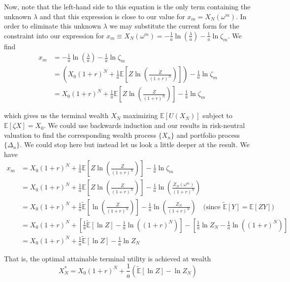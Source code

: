 \documentclass[12pt]{article}
\newlength\tindent
\renewcommand{\indent}{\hspace*{\tindent}}
\newcommand{\E}{\mathbb E}
\begin{document}
\indent Now, note that the left-hand side to this equation is the only term containing the unknown $\lambda$ and that this expression is close to our value for $x_m = X_N(\omega^m)$. In order to eliminate this unknown $\lambda$ we may substitute the current form for the constraint into our expression for $x_m \equiv X_N(\omega^m) =  -\frac{1}{a} \ln \left( \frac{\lambda}{a} \right) - \frac{1}{a} \ln \zeta_m$. We find
\begin{align*}
	x_m &= -\frac{1}{a} \ln \left( \frac{\lambda}{a} \right) - \frac{1}{a} \ln \zeta_m \\
	&= \left(  X_0(1 + r)^N + \frac{1}{a} \E \left[ Z \ln \left( \frac{Z}{(1 + r)^N} \right) \right] \right) - \frac{1}{a}\ln \zeta_m \\
	&=  X_0(1 + r)^N + \frac{1}{a} \E \left[ Z \ln \left( \frac{Z}{(1 + r)^N} \right) \right] - \frac{1}{a}\ln \zeta_m
\end{align*}

which gives us the terminal wealth $X_N$ maximizing $\E[U(X_N)]$ subject to $\E[\zeta X] = X_0$. We could use backwards induction and our results in risk-neutral valuation to find the corresponding wealth process $\{X_n\}$ and portfolio process $\{\Delta_n\}$. We could stop here but instead let us look a little deeper at the result. We have
\begin{align*}
	x_m &= X_0(1 + r)^N + \frac{1}{a} \E \left[ Z \ln \left( \frac{Z}{(1 + r)^N} \right) \right] - \frac{1}{a}\ln \zeta_m \\
	&= X_0(1 + r)^N + \frac{1}{a} \E \left[ Z \ln \left( \frac{Z}{(1 + r)^N} \right) \right] - \frac{1}{a}\ln \left( \frac{Z_N(\omega^m)}{(1 + r)^N} \right) \\
	&= X_0(1 + r)^N + \frac{1}{a} \tilde{\E} \left[ \ln \left( \frac{Z}{(1 + r)^N} \right) \right] - \frac{1}{a} \ln \left( \frac{Z_N}{(1 + r)^N} \right) \quad \text{(since } \tilde{\E}[Y] = \E[ZY]) \\
	&= X_0(1 + r)^N + \left[ \frac{1}{a} \tilde{\E} \left[ \ln Z \right] - \frac{1}{a}\ln \left((1 + r)^N\right) \right] - \left[ \frac{1}{a} \ln Z_N - \frac{1}{a} \ln \left((1 + r)^N\right) \right] \\
	&= X_0(1 + r)^N + \frac{1}{a}\tilde{\E}[\ln Z] - \frac{1}{a}\ln Z_N
\end{align*}

That is, the optimal attainable terminal utility is achieved at wealth
\begin{equation*}
	X^*_N = X_0(1 + r)^N + \frac{1}{a} \left( \tilde{\E}[\ln Z] - \ln Z_N \right)
\end{equation*}
\end{document}
